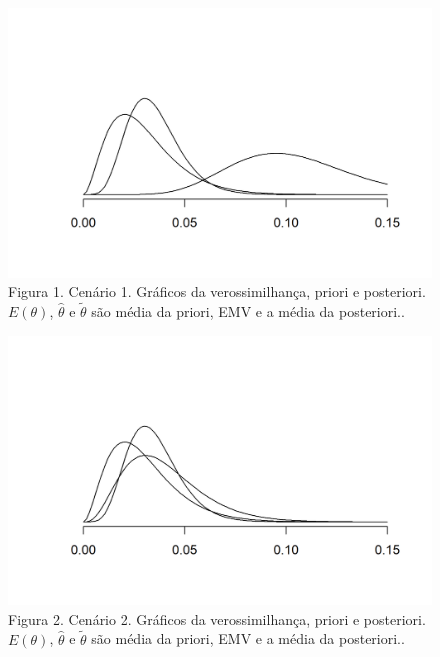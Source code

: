 \documentclass[
  letterpaper,
  DIV=11,
  numbers=noendperiod]{scrreprt}
\theoremstyle{definition}
\theoremstyle{definition}
\theoremstyle{remark}
\begin{document}
\begin{figure}

{\centering \includegraphics{conjugada_files/figure-pdf/conflito1-plot-1.png}

}

\caption{Figura 1. Cenário 1. Gráficos da verossimilhança, priori e
posteriori. \(E(\theta)\), \(\hat{\theta}\) e \(\tilde{\theta}\) são
média da priori, EMV e a média da posteriori..}

\end{figure}

\begin{figure}

{\centering \includegraphics{conjugada_files/figure-pdf/conflito2-plot-1.png}

}

\caption{Figura 2. Cenário 2. Gráficos da verossimilhança, priori e
posteriori. \(E(\theta)\), \(\hat{\theta}\) e \(\tilde{\theta}\) são
média da priori, EMV e a média da posteriori..}

\end{figure}
\end{document}
